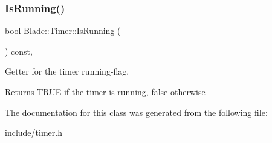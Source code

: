 \subsubsection{\texorpdfstring{Is\+Running()}{IsRunning()}}
{\footnotesize\ttfamily bool Blade\+::\+Timer\+::\+Is\+Running (\begin{DoxyParamCaption}{ }\end{DoxyParamCaption}) const\hspace{0.3cm}{\ttfamily [inline]}, {\ttfamily [noexcept]}}



Getter for the timer running-\/flag. 

\begin{DoxyReturn}{Returns}
T\+R\+UE if the timer is running, false otherwise 
\end{DoxyReturn}


The documentation for this class was generated from the following file\+:\begin{DoxyCompactItemize}
\item 
include/timer.\+h\end{DoxyCompactItemize}
